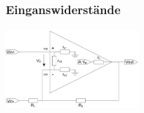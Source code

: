 \documentclass[margin=normal]{tex/hsrzf}
\begin{document}
\begin{multicols*}{2}
  \subsubsection*{Einganswiderstände}
  \includegraphics[width=5cm]{img/OpAmp/Fehler_Eingangswiderstand.png}\\
\end{multicols*}
\end{document}
